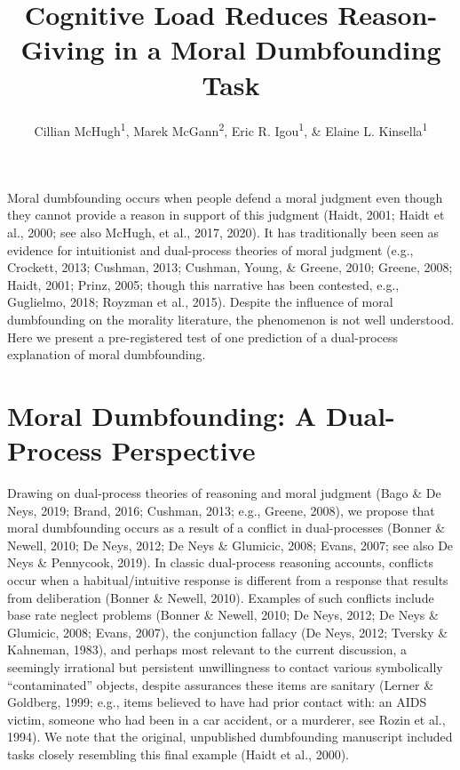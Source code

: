 \documentclass[
  man,floatsintext]{apa6}
\title{Cognitive Load Reduces Reason-Giving in a Moral Dumbfounding Task}
\author{Cillian McHugh\textsuperscript{1}, Marek McGann\textsuperscript{2}, Eric R. Igou\textsuperscript{1}, \& Elaine L. Kinsella\textsuperscript{1}}
\date{}
\affiliation{\vspace{0.5cm}\textsuperscript{1} Department of Psychology, University of Limerick\\\textsuperscript{2} Department of Psychology, Mary Immaculate College, University of Limerick}
\begin{document}
\maketitle

Moral dumbfounding occurs when people defend a moral judgment even though they cannot provide a reason in support of this judgment (Haidt, 2001; Haidt et al., 2000; see also McHugh, et al., 2017, 2020). It has traditionally been seen as evidence for intuitionist and dual-process theories of moral judgment (e.g., Crockett, 2013; Cushman, 2013; Cushman, Young, \& Greene, 2010; Greene, 2008; Haidt, 2001; Prinz, 2005; though this narrative has been contested, e.g., Guglielmo, 2018; Royzman et al., 2015). Despite the influence of moral dumbfounding on the morality literature, the phenomenon is not well understood. Here we present a pre-registered test of one prediction of a dual-process explanation of moral dumbfounding.

\hypertarget{moral-dumbfounding-a-dual-process-perspective}{%
\section{Moral Dumbfounding: A Dual-Process Perspective}\label{moral-dumbfounding-a-dual-process-perspective}}

Drawing on dual-process theories of reasoning and moral judgment (Bago \& De Neys, 2019; Brand, 2016; Cushman, 2013; e.g., Greene, 2008), we propose that moral dumbfounding occurs as a result of a conflict in dual-processes (Bonner \& Newell, 2010; De Neys, 2012; De Neys \& Glumicic, 2008; Evans, 2007; see also De Neys \& Pennycook, 2019). In classic dual-process reasoning accounts, conflicts occur when a habitual/intuitive response is different from a response that results from deliberation (Bonner \& Newell, 2010). Examples of such conflicts include base rate neglect problems (Bonner \& Newell, 2010; De Neys, 2012; De Neys \& Glumicic, 2008; Evans, 2007), the conjunction fallacy (De Neys, 2012; Tversky \& Kahneman, 1983), and perhaps most relevant to the current discussion, a seemingly irrational but persistent unwillingness to contact various symbolically ``contaminated'' objects, despite assurances these items are sanitary (Lerner \& Goldberg, 1999; e.g., items believed to have had prior contact with: an AIDS victim, someone who had been in a car accident, or a murderer, see Rozin et al., 1994). We note that the original, unpublished dumbfounding manuscript included tasks closely resembling this final example (Haidt et al., 2000).
\end{document}
